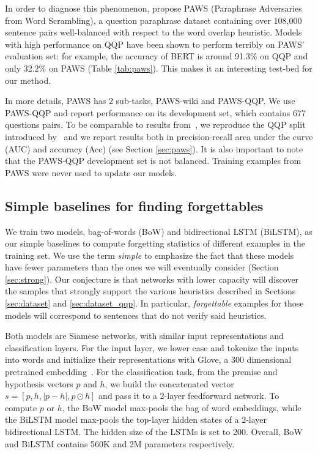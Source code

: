 In order to diagnose this phenomenon, \citet{zhang-etal-2019-paws} propose PAWS (Paraphrase Adversaries from Word Scrambling), a question paraphrase dataset containing over 108,000 sentence pairs well-balanced with respect to the word overlap heuristic. Models with high performance on QQP have been shown to perform terribly on PAWS' evaluation set: for example, the accuracy of BERT is around 91.3\% on QQP and only 32.2\% on PAWS (Table \ref{tab:paws}). This makes it an interesting test-bed for our method. 

In more details, PAWS has 2 sub-tasks, PAWS-wiki and PAWS-QQP. We use PAWS-QQP and report performance on its development set, which contains 677 questions pairs. To be comparable to results from~\citet{zhang-etal-2019-paws}, we reproduce the QQP split introduced by~\citet{wang2017bilateral} and we report results both in precision-recall area under the curve (AUC) and accuracy (Acc) (see Section \ref{sec:paws}). It is also important to note that the PAWS-QQP development set is not balanced. Training examples from PAWS were never used to update our models.



\subsection{Simple baselines for finding forgettables}
We train two models, bag-of-words (BoW) and bidirectional LSTM (BiLSTM), as our simple baselines to compute forgetting statistics of different examples in the training set. We use the term \textit{simple} to emphasize the fact that these models have fewer parameters than the ones we will eventually consider (Section \ref{sec:strong}). Our conjecture is that networks with lower capacity will discover the samples that strongly support the various heuristics described in Sections \ref{sec:dataset} and  \ref{sec:dataset_qqp}. In particular, \emph{forgettable} examples for those models will correspond to sentences that do not verify said heuristics.

Both models are Siamese networks, with similar input representations and classification layers.
For the input layer, we lower case and tokenize the inputs into words and initialize their representations with Glove, a 300 dimensional pretrained embedding~\citep{pennington2014glove}.
For the classification task, from the premise and hypothesis vectors $p$ and $h$, we build the concatenated vector $s = [p, h, |p - h|, p \odot h]$ and pass it to a 2-layer feedforward network. 
To compute $p$ or $h$, the BoW model max-pools the bag of word embeddings,
while the BiLSTM model max-pools the top-layer hidden states of a 2-layer bidirectional LSTM. The hidden size of the LSTMs is set to 200. Overall, BoW and BiLSTM contains 560K and 2M parameters respectively.

